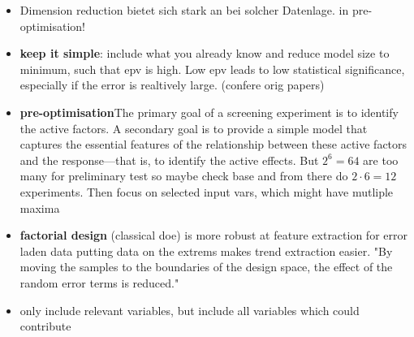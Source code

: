\begin{itemize}
    \item Dimension reduction bietet sich stark an bei solcher Datenlage. in pre-optimisation!
    \item \textbf{keep it simple}: include what you already know and reduce model size to minimum, such that \gls{epv} is high.  Low \gls{epv} leads to low statistical significance, especially if the error is realtively large. (confere orig papers)
    \item \textbf{pre-optimisation}{The primary goal of a screening experiment is to identify the active factors. A secondary goal is to provide a simple model that captures the essential features of the relationship between these active factors and the response—that is, to identify the active effects. \cite{miller2001using}} But $2^6=64$ are too many for preliminary test so maybe check base and from there do $2\cdot6=12$ experiments. Then focus on selected input vars, which might have mutliple maxima \\ 
    \item \textbf{factorial design} (classical \gls{doe}) is more robust at feature extraction for error laden data \cite{giunta2003overview} putting data on the extrems makes trend extraction easier. "By moving the samples to the boundaries of the design space, the effect of the random error terms is reduced."
    \item only include relevant variables\cite{gunst2009fractional}, but include all variables which could contribute\cite{haertler2014statistisch}

\end{itemize}
